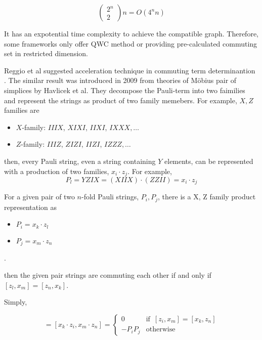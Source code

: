 \begin{equation}
    \left( \begin{matrix} 2^n \\ 2 \end{matrix} \right) n = O(4^n n)
\end{equation}

It has an expotential time complexity to achieve the compatible graph. 
Therefore, some frameworks only offer QWC method or providing 
pre-calculated commuting set in restricted dimension. %


Reggio et al suggested acceleration technique in commuting term determinantion
\cite{reggio_fast_2023}. 
The similar result was introduced in 2009 from theories of Möbius pair of simplices by Havlicek et al\cite{havlicek_moebius_2009}.
They decompose the Pauli-term into two faimilies and represent the strings as product of two family memebers.
For example, $X, Z$ families are

\begin{itemize}
    \item $X$-family: $IIIX$, $XIXI$, $IIXI$, $IXXX, \dots$
    \item $Z$-family: $IIIZ$, $ZIZI$, $IIZI$, $IZZZ, \dots$
\end{itemize}
then, every Pauli string, even a string containing $Y$ elements, can be represented 
with a production of two families, $x_i \cdot z_j$.
For example, 
\begin{equation}
    P_l = YZIX = (XIIX) \cdot (ZZII) = x_i \cdot z_j
\end{equation}

\begin{theorem}
    
    For a given pair of two $n$-fold Pauli strings, $P_i, P_j$,
    there is a X, Z family product representation as 

    \begin{itemize}
        \item $P_i = x_k \cdot z_l$
        \item $P_j = x_m \cdot z_n$
    \end{itemize}.

    then the given pair strings are commuting each other if and only if 
    $[z_l, x_m] =  [z_n, x_k]$.

\end{theorem}

Simply,

\begin{equation}
    [P_i, P_j] = [x_k \cdot z_i, x_m \cdot z_n] = \begin{cases} 
        0 & \mbox{if } \, [z_i, x_m] = [x_k, z_n] \\
        -P_i P_j & \mbox{otherwise}
     \end{cases}
\end{equation}

